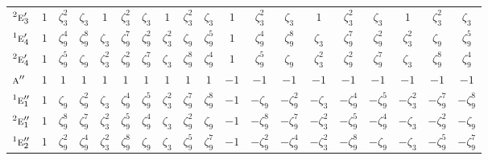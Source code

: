 \documentclass[10pt,a4paper]{article}
\numberwithin{equation}{section}
\newcommand{\irr}[1]{\text{\normalfont\scshape #1}}
\newcommand{\conjpair}[1]{{}^{#1}}
\newcommand{\rootunity}[1]{\zeta_{#1}}
\begin{document}
{\begin{longtable}{@{}lcccccccccccccccccc@{}}
$\conjpair{2}\irr{e}_{3}'$ & $1$ & $\rootunity{3}^{2}$ & $\rootunity{3}$ & $1$ & $\rootunity{3}^{2}$ & $\rootunity{3}$ & $1$ & $\rootunity{3}^{2}$ & $\rootunity{3}$ & $1$ & $\rootunity{3}^{2}$ & $\rootunity{3}$ & $1$ & $\rootunity{3}^{2}$ & $\rootunity{3}$ & $1$ & $\rootunity{3}^{2}$ & $\rootunity{3}$\\
$\conjpair{1}\irr{e}_{4}'$ & $1$ & $\rootunity{9}^{4}$ & $\rootunity{9}^{8}$ & $\rootunity{3}$ & $\rootunity{9}^{7}$ & $\rootunity{9}^{2}$ & $\rootunity{3}^{2}$ & $\rootunity{9}$ & $\rootunity{9}^{5}$ & $1$ & $\rootunity{9}^{4}$ & $\rootunity{9}^{8}$ & $\rootunity{3}$ & $\rootunity{9}^{7}$ & $\rootunity{9}^{2}$ & $\rootunity{3}^{2}$ & $\rootunity{9}$ & $\rootunity{9}^{5}$\\
$\conjpair{2}\irr{e}_{4}'$ & $1$ & $\rootunity{9}^{5}$ & $\rootunity{9}$ & $\rootunity{3}^{2}$ & $\rootunity{9}^{2}$ & $\rootunity{9}^{7}$ & $\rootunity{3}$ & $\rootunity{9}^{8}$ & $\rootunity{9}^{4}$ & $1$ & $\rootunity{9}^{5}$ & $\rootunity{9}$ & $\rootunity{3}^{2}$ & $\rootunity{9}^{2}$ & $\rootunity{9}^{7}$ & $\rootunity{3}$ & $\rootunity{9}^{8}$ & $\rootunity{9}^{4}$\\
$\irr{a}''$ & $1$ & $1$ & $1$ & $1$ & $1$ & $1$ & $1$ & $1$ & $1$ & $-1$ & $-1$ & $-1$ & $-1$ & $-1$ & $-1$ & $-1$ & $-1$ & $-1$\\
$\conjpair{1}\irr{e}_{1}''$ & $1$ & $\rootunity{9}$ & $\rootunity{9}^{2}$ & $\rootunity{3}$ & $\rootunity{9}^{4}$ & $\rootunity{9}^{5}$ & $\rootunity{3}^{2}$ & $\rootunity{9}^{7}$ & $\rootunity{9}^{8}$ & $-1$ & $-\rootunity{9}$ & $-\rootunity{9}^{2}$ & $-\rootunity{3}$ & $-\rootunity{9}^{4}$ & $-\rootunity{9}^{5}$ & $-\rootunity{3}^{2}$ & $-\rootunity{9}^{7}$ & $-\rootunity{9}^{8}$\\
$\conjpair{2}\irr{e}_{1}''$ & $1$ & $\rootunity{9}^{8}$ & $\rootunity{9}^{7}$ & $\rootunity{3}^{2}$ & $\rootunity{9}^{5}$ & $\rootunity{9}^{4}$ & $\rootunity{3}$ & $\rootunity{9}^{2}$ & $\rootunity{9}$ & $-1$ & $-\rootunity{9}^{8}$ & $-\rootunity{9}^{7}$ & $-\rootunity{3}^{2}$ & $-\rootunity{9}^{5}$ & $-\rootunity{9}^{4}$ & $-\rootunity{3}$ & $-\rootunity{9}^{2}$ & $-\rootunity{9}$\\
$\conjpair{1}\irr{e}_{2}''$ & $1$ & $\rootunity{9}^{2}$ & $\rootunity{9}^{4}$ & $\rootunity{3}^{2}$ & $\rootunity{9}^{8}$ & $\rootunity{9}$ & $\rootunity{3}$ & $\rootunity{9}^{5}$ & $\rootunity{9}^{7}$ & $-1$ & $-\rootunity{9}^{2}$ & $-\rootunity{9}^{4}$ & $-\rootunity{3}^{2}$ & $-\rootunity{9}^{8}$ & $-\rootunity{9}$ & $-\rootunity{3}$ & $-\rootunity{9}^{5}$ & $-\rootunity{9}^{7}$\\

\end{longtable}}
\end{document}
